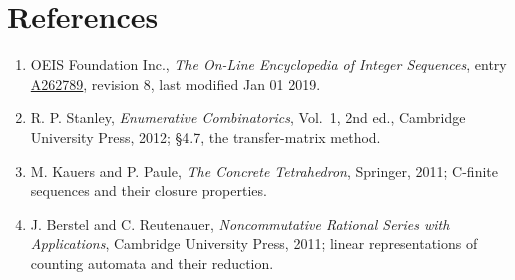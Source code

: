 \documentclass[11pt]{article}
\theoremstyle{definition}
\begin{document}
\section{References}

\begin{enumerate}

\item OEIS Foundation Inc., \emph{The On-Line Encyclopedia of Integer Sequences}, entry \href{https://oeis.org/A262789}{A262789}, revision 8, last modified Jan 01 2019.

\item R. P. Stanley, \emph{Enumerative Combinatorics}, Vol.~1, 2nd ed., Cambridge University Press, 2012; \S4.7, the transfer-matrix method.

\item M. Kauers and P. Paule, \emph{The Concrete Tetrahedron}, Springer, 2011; C-finite sequences and their closure properties.

\item J. Berstel and C. Reutenauer, \emph{Noncommutative Rational Series with Applications}, Cambridge University Press, 2011; linear representations of counting automata and their reduction.

\end{enumerate}
\end{document}
